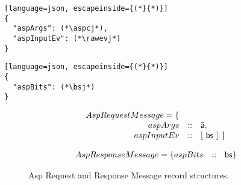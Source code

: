 \begin{lstlisting}[language=json, escapeinside={(*}{*)}]
{
  "aspArgs": (*\aspcj*),
  "aspInputEv": (*\rawevj*)
}
\end{lstlisting}

\begin{lstlisting}[language=json, escapeinside={(*}{*)}]
{
  "aspBits": (*\bsj*)
}
\end{lstlisting}

\begin{figure}

\[\begin{array}{rcl}
      AspRequestMessage = \{\\
      aspArgs &:: &\mathsf{\bar{a}},\\
      aspInputEv &:: &[~\mathsf{bs}~]~\}
  \end{array}\]

\[\begin{array}{rcl}
      AspResponseMessage = \{ aspBits &:: &\mathsf{bs} \}
  \end{array}\]

  \caption{Asp Request and Response Message record structures.}\label{fig:asp-messages-grammar}
\end{figure}




